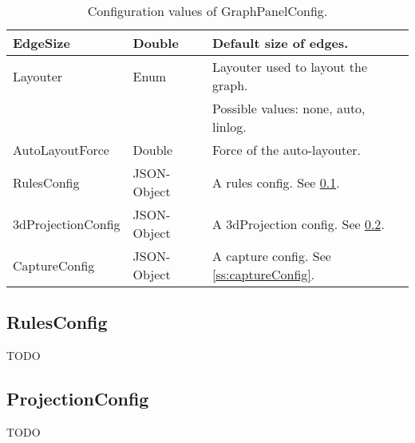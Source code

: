 \begin{table}[h]
\begin{tabular}[h]{|l|l|l|}
	\hline
	EdgeSize & Double & Default size of edges.\\
	\hline
	Layouter & Enum & Layouter used to layout the graph.\\
	& & Possible values: none, auto, linlog.\\
	\hline
	AutoLayoutForce & Double & Force of the auto-layouter.\\
	\hline
	RulesConfig & JSON-Object & A rules config. See \ref{ss:rulesConfig}.\\
	\hline
	3dProjectionConfig & JSON-Object & A 3dProjection config. See \ref{ss:projectionConfig}.\\
	\hline
	CaptureConfig & JSON-Object & A capture config. See \ref{ss:captureConfig}.\\
	\hline
\end{tabular}
\caption{Configuration values of GraphPanelConfig.}
\label{tab:graphPanelConfigValues}
\end{table}

\subsection{RulesConfig}
\label{ss:rulesConfig}
TODO

\subsection{ProjectionConfig}
\label{ss:projectionConfig}
TODO

